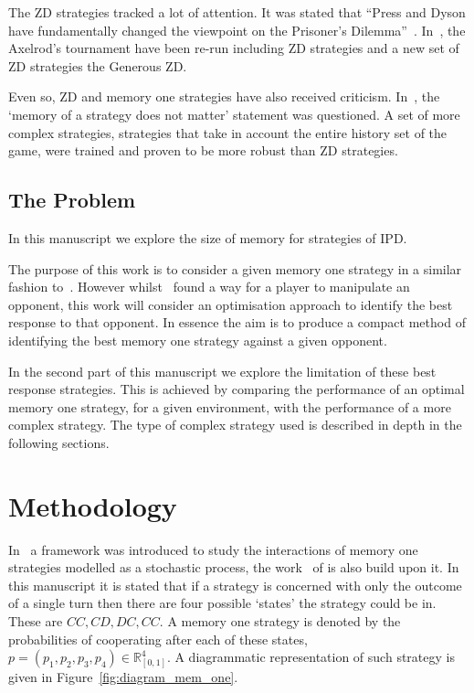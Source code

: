 \documentclass[10pt]{article}
\newcommand{\R}{\mathbb{R}}
\begin{document}
The ZD strategies tracked a lot of attention. It was stated that
``Press and Dyson have fundamentally changed the viewpoint on the Prisoner's
Dilemma''~\cite{Stewart2012}. In~\cite{Stewart2012}, the Axelrod's
tournament have been re-run including ZD strategies and a new set of ZD
strategies the Generous ZD.

Even so, ZD and memory one strategies have also received criticism. In~\cite{Harper2015},
the `memory of a strategy does not matter' statement was questioned. A set of more
complex strategies, strategies that take in account the entire history set of the
game, were trained and proven to be more robust than ZD strategies.

\subsection{The Problem}

In this manuscript we explore the size of memory for strategies of IPD.%

The purpose of this work is to consider a given memory one strategy 
in a similar fashion to~\cite{Press2012}. However whilst~\cite{Press2012} found
a way for a player to manipulate an opponent, this work will consider an
optimisation approach to identify the best response to that opponent.
In essence the aim is to produce a compact method of identifying the best memory
one strategy against a given opponent.

In the second part of this manuscript we explore the limitation of these best response
strategies. This is achieved by comparing the performance of an optimal
memory one strategy, for a given environment, with the performance of a more complex
strategy. The type of complex strategy used is described in depth in the
following sections.

\section{Methodology}

In~\cite{Nowak1989} a framework was introduced to study the interactions of memory
one strategies modelled as a stochastic process, the work~\cite{Press2012} of is
also build upon it. In this manuscript it is stated that if a strategy
is concerned with only the outcome of a single turn then there are four possible `states'
the strategy could be in. These are \(CC, CD, DC,CC\). A memory one strategy is denoted
by the probabilities of cooperating after each of these states,
\(p=(p_1, p_2, p_3, p_4) \in \R_{[0,1]} ^ 4\). A diagrammatic representation of
such strategy is given in Figure~\ref{fig:diagram_mem_one}.
\end{document}
